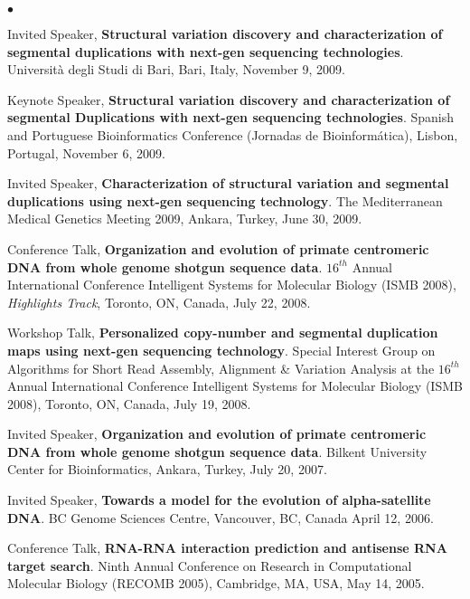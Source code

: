 \documentclass[margin,line]{res}
\newenvironment{list2}{
  \begin{list}{$\bullet$}{%
      \setlength{\itemsep}{0in}
      \setlength{\parsep}{0in} \setlength{\parskip}{0in}
      \setlength{\topsep}{0in} \setlength{\partopsep}{0in} 
      \setlength{\leftmargin}{0.2in}}}{\end{list}}
\begin{document}
\begin{resume}
\begin{list2}
\item 
  Invited Speaker, {\bf Structural variation discovery and characterization of segmental duplications with next-gen sequencing technologies}.
  Universit\`{a} degli Studi di Bari, 
  Bari, Italy, November 9, 2009.

\item 
  Keynote Speaker, {\bf Structural variation discovery and characterization of segmental Duplications with next-gen sequencing technologies}.
 Spanish and Portuguese Bioinformatics Conference (Jornadas de Bioinform\'{a}tica),
 Lisbon, Portugal, November 6, 2009.
\item 
  Invited Speaker, {\bf Characterization of structural variation and segmental duplications using next-gen sequencing technology}.
  The Mediterranean Medical Genetics Meeting 2009, Ankara, Turkey, June 30, 2009. 

\item
  Conference Talk, 
  {\bf Organization and evolution of primate centromeric DNA
from whole genome shotgun sequence data}.  $16^{th}$ Annual
International Conference Intelligent Systems for Molecular Biology (ISMB 2008), {\em Highlights Track},
Toronto, ON, Canada, July 22, 2008.

\item
  Workshop Talk, {\bf Personalized copy-number and segmental duplication maps using next-gen sequencing technology}.
Special Interest Group on Algorithms for Short Read Assembly, Alignment \& Variation Analysis at the
 $16^{th}$ Annual
International Conference Intelligent Systems for Molecular Biology (ISMB 2008),
Toronto, ON, Canada, July 19, 2008.

\item
  Invited Speaker, {\bf Organization and evolution of primate centromeric DNA
from whole genome shotgun sequence data}. Bilkent University Center for Bioinformatics,
Ankara, Turkey, July 20, 2007.

\item
  Invited Speaker, {\bf Towards a model for the evolution of alpha-satellite DNA}.
  BC Genome Sciences Centre, Vancouver, BC, Canada April 12, 2006.

\item  
  Conference Talk, {\bf RNA-RNA interaction prediction and antisense RNA target search}.
  Ninth Annual Conference on Research in Computational Molecular Biology (RECOMB 2005),
  Cambridge, MA, USA, May 14, 2005.
  
\item
 

\end{list2}
\end{resume}
\end{document}
